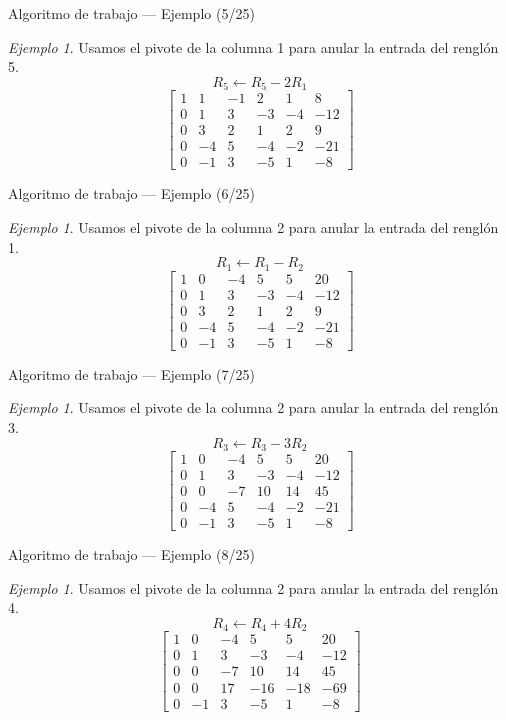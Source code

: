 \documentclass[aspectratio=169,11pt]{beamer}
\theoremstyle{remark}
\newtheorem{Ejem}[definicion]{Ejemplo}
\begin{document}
\begin{frame}{Algoritmo de trabajo — Ejemplo (5/25)}
\begin{Ejem}
Usamos el pivote de la columna 1 para anular la entrada del renglón 5.
\[
R_{5}\leftarrow R_{5}-2R_{1}
\]
\[
\left[\begin{array}{ccccc|c}
1 & 1 & -1 & 2 & 1 & 8\\
0 & 1 & 3 & -3 & -4 & -12\\
0 & 3 & 2 & 1 & 2 & 9\\
0 & -4 & 5 & -4 & -2 & -21\\
0 & -1 & 3 & -5 & 1 & -8
\end{array}\right]
\]
\end{Ejem}
\end{frame}

\begin{frame}{Algoritmo de trabajo — Ejemplo (6/25)}
\begin{Ejem}
Usamos el pivote de la columna 2 para anular la entrada del renglón 1.
\[
R_{1}\leftarrow R_{1}-R_{2}
\]
\[
\left[\begin{array}{ccccc|c}
1 & 0 & -4 & 5 & 5 & 20\\
0 & 1 & 3 & -3 & -4 & -12\\
0 & 3 & 2 & 1 & 2 & 9\\
0 & -4 & 5 & -4 & -2 & -21\\
0 & -1 & 3 & -5 & 1 & -8
\end{array}\right]
\]
\end{Ejem}
\end{frame}

\begin{frame}{Algoritmo de trabajo — Ejemplo (7/25)}
\begin{Ejem}
Usamos el pivote de la columna 2 para anular la entrada del renglón 3.
\[
R_{3}\leftarrow R_{3}-3R_{2}
\]
\[
\left[\begin{array}{ccccc|c}
1 & 0 & -4 & 5 & 5 & 20\\
0 & 1 & 3 & -3 & -4 & -12\\
0 & 0 & -7 & 10 & 14 & 45\\
0 & -4 & 5 & -4 & -2 & -21\\
0 & -1 & 3 & -5 & 1 & -8
\end{array}\right]
\]
\end{Ejem}
\end{frame}

\begin{frame}{Algoritmo de trabajo — Ejemplo (8/25)}
\begin{Ejem}
Usamos el pivote de la columna 2 para anular la entrada del renglón 4.
\[
R_{4}\leftarrow R_{4}+4R_{2}
\]
\[
\left[\begin{array}{ccccc|c}
1 & 0 & -4 & 5 & 5 & 20\\
0 & 1 & 3 & -3 & -4 & -12\\
0 & 0 & -7 & 10 & 14 & 45\\
0 & 0 & 17 & -16 & -18 & -69\\
0 & -1 & 3 & -5 & 1 & -8
\end{array}\right]
\]
\end{Ejem}
\end{frame}
\end{document}
